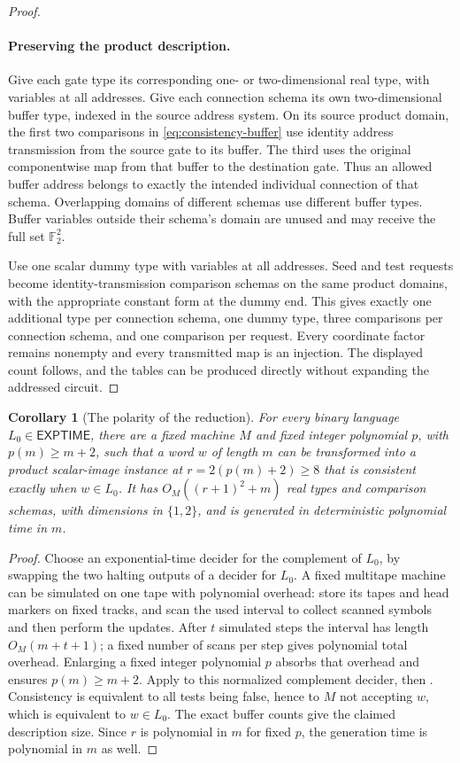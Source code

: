 \documentclass[11pt]{article}
\newtheorem{corollary}[theorem]{Corollary}
\theoremstyle{definition}
\newcommand{\F}{\mathbb F_2}
\newcommand{\EXPTIME}{\mathsf{EXPTIME}}
\begin{document}
\begin{proof}
\paragraph{Preserving the product description.}
Give each gate type its corresponding one- or two-dimensional real type,
with variables at all addresses. Give each connection schema its own
two-dimensional buffer type, indexed in the source address system. On its
source product domain, the first two comparisons in
\eqref{eq:consistency-buffer} use identity address transmission from the
source gate to its buffer. The third uses the original componentwise map
from that buffer to the destination gate. Thus an allowed buffer address
belongs to exactly the intended individual connection of that schema.
Overlapping domains of different schemas use different buffer types.
Buffer variables outside their schema's domain are unused and may receive
the full set $\F^2$.

Use one scalar dummy type with variables at all addresses. Seed and test
requests become identity-transmission comparison schemas on the same
product domains, with the appropriate constant form at the dummy end.
This gives exactly one additional type per connection schema, one dummy
type, three comparisons per connection schema, and one comparison per
request. Every coordinate factor remains nonempty and every transmitted
map is an injection. The displayed count follows, and the tables can be
produced directly without expanding the addressed circuit.
\end{proof}

\begin{corollary}[The polarity of the reduction]\label{prop:computation-images}
For every binary language \(L_0\in\EXPTIME\), there are a fixed machine
\(M\) and fixed integer polynomial \(p\), with \(p(m)\ge m+2\), such that
a word \(w\) of length \(m\) can be transformed into a product
scalar-image instance at \(r=2(p(m)+2)\ge8\) that is consistent exactly
when \(w\in L_0\). It has \(O_M((r+1)^2+m)\) real types and
comparison schemas, with dimensions in \(\{1,2\}\), and is generated
in deterministic polynomial time in \(m\).
\end{corollary}
\begin{proof}
Choose an exponential-time decider for the complement of \(L_0\),
by swapping the two halting outputs of a decider for \(L_0\).
A fixed multitape machine can be simulated on one tape with polynomial
overhead: store its tapes and head markers on fixed tracks, and scan the
used interval to collect scanned symbols and then perform the updates.
After \(t\) simulated steps the interval has length \(O_M(m+t+1)\);
a fixed number of scans per step gives polynomial total overhead.
Enlarging a fixed integer polynomial \(p\) absorbs that overhead and
ensures \(p(m)\ge m+2\). Apply  to this normalized
complement decider, then . Consistency is equivalent
to all tests being false, hence to \(M\) not accepting \(w\), which is
equivalent to \(w\in L_0\). The exact buffer counts give the claimed
description size. Since \(r\) is polynomial in \(m\) for fixed \(p\),
the generation time is polynomial in \(m\) as well.
\end{proof}
\end{document}
